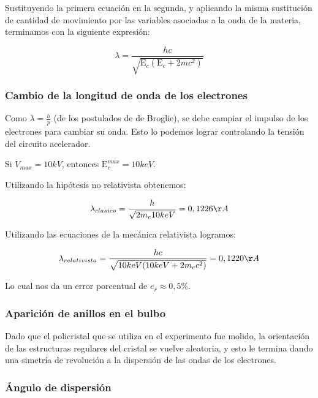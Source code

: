 \documentclass[]{article}
\begin{document}
Sustituyendo la primera ecuación en la segunda, y aplicando la misma
sustitución de cantidad de movimiento por las variables asociadas a la
onda de la materia, terminamos con la siguiente expresión:

\[\lambda = \frac{hc}{\sqrt{\mathrm{E}_c(\mathrm{E}_c + 2mc^2)}}\]

\hypertarget{cambio-de-la-longitud-de-onda-de-los-electrones}{%
\subsubsection{Cambio de la longitud de onda de los
electrones}\label{cambio-de-la-longitud-de-onda-de-los-electrones}}

Como \(\lambda = \frac{h}{p}\) (de los postulados de de Broglie), se
debe campiar el impulso de los electrones para cambiar su onda. Esto lo
podemos lograr controlando la tensión del circuito acelerador.

Si \(V_{max} = 10 kV\), entonces \(\mathrm{E}_c^{max} = 10 keV\).

Utilizando la hipótesis no relativista obtenemos:

\[\lambda_{clasico} = \frac{h}{\sqrt{2m_e 10keV}} = 0,1226 \AA\]

Utilizando las ecuaciones de la mecánica relativista logramos:

\[\lambda_{relativista} = \frac{hc}{\sqrt{10keV(10keV + 2m_ec^2)}}
= 0,1220 \AA\]

Lo cual nos da un error porcentual de \(e_r \approx 0,5\%\).

\hypertarget{apariciuxf3n-de-anillos-en-el-bulbo}{%
\subsubsection{Aparición de anillos en el
bulbo}\label{apariciuxf3n-de-anillos-en-el-bulbo}}

Dado que el policristal que se utiliza en el experimento fue molido, la
orientación de las estructuras regulares del cristal se vuelve
aleatoria, y esto le termina dando una simetría de revolución a la
dispersión de las ondas de los electrones.

\hypertarget{uxe1ngulo-de-dispersiuxf3n}{%
\subsubsection{Ángulo de dispersión}\label{uxe1ngulo-de-dispersiuxf3n}}
\end{document}
